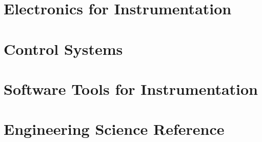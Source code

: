 







\part{Electronics for Instrumentation}








\part{Control Systems}





\part{Software Tools for Instrumentation}



% 

\part{Engineering Science Reference}




\backmatter






\printindex


